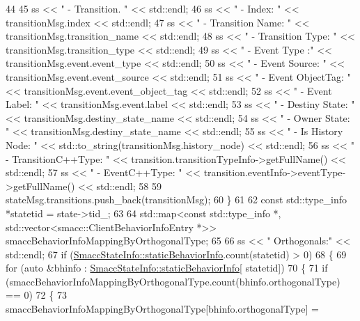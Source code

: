 \begin{DoxyCode}
44 
45             ss << \textcolor{stringliteral}{" - Transition.  "} << std::endl;
46             ss << \textcolor{stringliteral}{"      - Index: "} << transitionMsg.index << std::endl;
47             ss << \textcolor{stringliteral}{"      - Transition Name: "} << transitionMsg.transition\_name << std::endl;
48             ss << \textcolor{stringliteral}{"      - Transition Type: "} << transitionMsg.transition\_type << std::endl;
49             ss << \textcolor{stringliteral}{"      - Event Type :"} << transitionMsg.event.event\_type << std::endl;
50             ss << \textcolor{stringliteral}{"      - Event Source: "} << transitionMsg.event.event\_source << std::endl;
51             ss << \textcolor{stringliteral}{"      - Event ObjectTag: "} << transitionMsg.event.event\_object\_tag << std::endl;
52             ss << \textcolor{stringliteral}{"      - Event Label: "} << transitionMsg.event.label << std::endl;
53             ss << \textcolor{stringliteral}{"      - Destiny State: "} << transitionMsg.destiny\_state\_name << std::endl;
54             ss << \textcolor{stringliteral}{"      - Owner State: "} << transitionMsg.destiny\_state\_name << std::endl;
55             ss << \textcolor{stringliteral}{"      - Is History Node: "} << std::to\_string(transitionMsg.history\_node) << std::endl;
56             ss << \textcolor{stringliteral}{"      - TransitionC++Type: "} << transition.transitionTypeInfo->getFullName() << 
      std::endl;
57             ss << \textcolor{stringliteral}{"      - EventC++Type: "} << transition.eventInfo->eventType->getFullName() << std::endl;
58 
59             stateMsg.transitions.push\_back(transitionMsg);
60         \}
61 
62         \textcolor{keyword}{const} std::type\_info *statetid = state->tid\_;
63 
64         std::map<const std::type\_info *, std::vector<smacc::ClientBehaviorInfoEntry *>> 
      smaccBehaviorInfoMappingByOrthogonalType;
65 
66         ss << \textcolor{stringliteral}{" Orthogonals:"} << std::endl;
67         \textcolor{keywordflow}{if} (\hyperlink{classsmacc_1_1introspection_1_1SmaccStateInfo_ad3d8b3450060cb0b91f38fb2fe0a7678}{SmaccStateInfo::staticBehaviorInfo}.count(statetid) > 0)
68         \{
69             \textcolor{keywordflow}{for} (\textcolor{keyword}{auto} &bhinfo : \hyperlink{classsmacc_1_1introspection_1_1SmaccStateInfo_ad3d8b3450060cb0b91f38fb2fe0a7678}{SmaccStateInfo::staticBehaviorInfo}[
      statetid])
70             \{
71                 \textcolor{keywordflow}{if} (smaccBehaviorInfoMappingByOrthogonalType.count(bhinfo.orthogonalType) == 0)
72                 \{
73                     smaccBehaviorInfoMappingByOrthogonalType[bhinfo.orthogonalType] = 

\end{DoxyCode}
